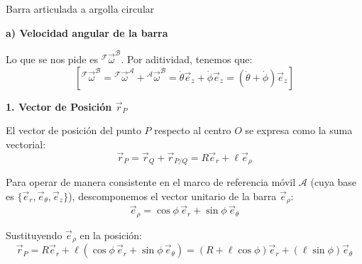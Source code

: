 \begin{solucion}{Barra articulada a argolla circular}
\begin{center}
\end{center}

\vspace{0.3cm}

\noindent\textbf{a) Velocidad angular de la barra}

\noindent Lo que se nos pide es ${}^{\mathcal{F}}\vec{\omega}^{\mathcal{B}}$. Por aditividad, tenemos que:
\[
\left[ {}^{\mathcal{F}}\vec{\omega}^{\mathcal{B}} = {}^{\mathcal{F}}\vec{\omega}^{\mathcal{A}} + {}^{\mathcal{A}}\vec{\omega}^{\mathcal{B}} = \dot{\theta}\vec{e}_z + \dot{\phi}\vec{e}_z = (\dot{\theta} + \dot{\phi})\vec{e}_z \right]
\]

\vspace{0.6cm}

\noindent\textbf{1. Vector de Posición $\vec{r}_P$}

El vector de posición del punto $P$ respecto al centro $O$ se expresa como la suma vectorial:
\[
\vec{r}_P = \vec{r}_Q + \vec{r}_{P/Q} = R\vec{e}_r + \ell\vec{e}_\rho
\]

Para operar de manera consistente en el marco de referencia móvil $\mathcal{A}$ (cuya base es $\{\vec{e}_r, \vec{e}_\theta, \vec{e}_z\}$), descomponemos el vector unitario de la barra $\vec{e}_\rho$:
\[
\vec{e}_\rho = \cos\phi\,\vec{e}_r + \sin\phi\,\vec{e}_\theta
\]

Sustituyendo $\vec{e}_\rho$ en la posición:
\[
\vec{r}_P = R\vec{e}_r + \ell(\cos\phi\,\vec{e}_r + \sin\phi\,\vec{e}_\theta) = (R + \ell\cos\phi)\vec{e}_r + (\ell\sin\phi)\vec{e}_\theta
\]


\end{solucion}
